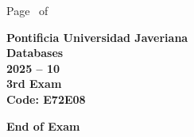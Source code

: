 \documentclass[11pt, addpoints]{exam}\usepackage[utf8]{inputenc}
\begin{document}
\begin{coverpages}
\begin{center}
			\vspace{3mm}
			\leavevmode \hspace{5mm} 
		\end{center}
	\end{coverpages}

	\footer{} {Page \thepage\ of \numpages} {}

	\centering
	\textbf{\Large Pontificia Universidad Javeriana}\\
	\textbf{\Large Databases} \\
	\textbf{\large 2025 -- 10} \\
	\textbf{\large 3rd Exam} \\
	\textbf{Code: E72E08}


	\begin{questions}
		
		
		
		
		
		
		
		
		
		
		
		
		
		
		
		
		
		
		
		
	\end{questions}

	\vspace{5mm}
	\noindent \textbf{End of Exam}
\end{document}
